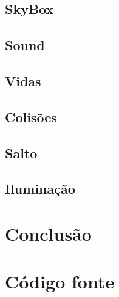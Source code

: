 \documentclass[12pt,a4paper,portuges]{style/myreport}
\begin{document}
\section{SkyBox}


\section{Sound}


\section{Vidas}


\section{Colisões}


\section{Salto}


\section{Iluminação}


\newpage

\chapter{Conclusão}




\appendix
\chapter{Código fonte}
\end{document}
